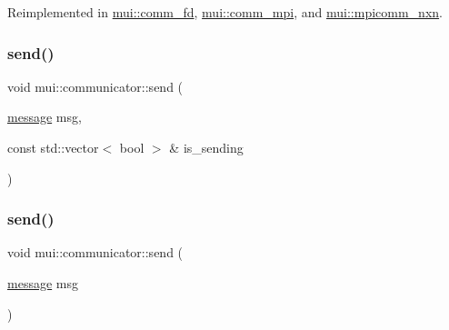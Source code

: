 Reimplemented in \hyperlink{classmui_1_1comm__fd_a6d5e989af8268c87b7c7bcd18a0a9a11}{mui\+::comm\+\_\+fd}, \hyperlink{classmui_1_1comm__mpi_abbf8ab973f51af297cc7ecf145f6cd84}{mui\+::comm\+\_\+mpi}, and \hyperlink{classmui_1_1mpicomm__nxn_ac5597865b5cad6ed82e02f40aa8333b9}{mui\+::mpicomm\+\_\+nxn}.

\mbox{\label{classmui_1_1communicator_ae81f0d5aedaad66cad99ff0d8258e72c}} 
\subsubsection{\texorpdfstring{send()}{send()}\hspace{0.1cm}{\footnotesize\ttfamily [1/2]}}
{\footnotesize\ttfamily void mui\+::communicator\+::send (\begin{DoxyParamCaption}\item[{\hyperlink{structmui_1_1message}{message}}]{msg,  }\item[{const std\+::vector$<$ bool $>$ \&}]{is\+\_\+sending }\end{DoxyParamCaption})\hspace{0.3cm}{\ttfamily [inline]}}

\mbox{\label{classmui_1_1communicator_ae6e96be2a9ef6ebbd1ead1add1921181}} 
\subsubsection{\texorpdfstring{send()}{send()}\hspace{0.1cm}{\footnotesize\ttfamily [2/2]}}
{\footnotesize\ttfamily void mui\+::communicator\+::send (\begin{DoxyParamCaption}\item[{\hyperlink{structmui_1_1message}{message}}]{msg }\end{DoxyParamCaption})\hspace{0.3cm}{\ttfamily [inline]}}

\mbox{\label{classmui_1_1communicator_a1fccb014ae855d7b7d0fc53f7f22b9aa}} 
